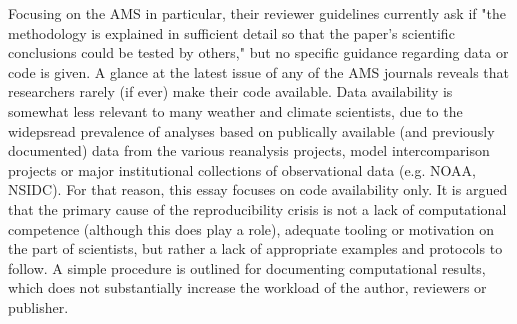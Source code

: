 Focusing on the AMS in particular, their reviewer guidelines currently ask if "the methodology is explained in sufficient detail so that the paper's scientific conclusions could be tested by others," but no specific guidance regarding data or code is given. A glance at the latest issue of any of the AMS journals reveals that researchers rarely (if ever) make their code available. Data availability is somewhat less relevant to many weather and climate scientists, due to the widepsread prevalence of analyses based on publically available (and previously documented) data from the various reanalysis projects, model intercomparison projects or major institutional collections of observational data (e.g. NOAA, NSIDC). For that reason, this essay focuses on code availability only. It is argued that the primary cause of the reproducibility crisis is not a lack of computational competence (although this does play a role), adequate tooling or motivation on the part of scientists, but rather a lack of appropriate examples and protocols to follow. A simple procedure is outlined for documenting computational results, which does not substantially increase the workload of the author, reviewers or publisher.




